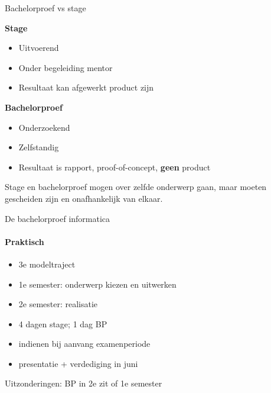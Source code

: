 \documentclass[usenames,dvipsnames]{beamer}
\begin{document}
\begin{frame}{Bachelorproef vs stage}

  \begin{multicols}{2}
    \textbf{Stage}
    
    \begin{itemize}
      \item Uitvoerend
      \item Onder begeleiding mentor
      \item Resultaat kan afgewerkt product zijn
    \end{itemize}
    
    \columnbreak
    
    \textbf{Bachelorproef}
    
    \begin{itemize}
      \item Onderzoekend
      \item Zelfstandig
      \item Resultaat is rapport, proof-of-concept, \textbf{geen} product
    \end{itemize}
  \end{multicols}

Stage en bachelorproef mogen over zelfde onderwerp gaan, maar moeten gescheiden zijn en onafhankelijk van elkaar.

\end{frame}

\begin{frame}{De bachelorproef informatica}
  \framesubtitle{Praktisch}
  
  \begin{itemize}
    \item 3e modeltraject
    \item 1e semester: onderwerp kiezen en uitwerken
    \item 2e semester: realisatie
    \item 4 dagen stage; 1 dag BP
    \item indienen bij aanvang examenperiode
    \item presentatie + verdediging in juni
  \end{itemize}

Uitzonderingen: BP in 2e zit of 1e semester
\end{frame}
\end{document}
